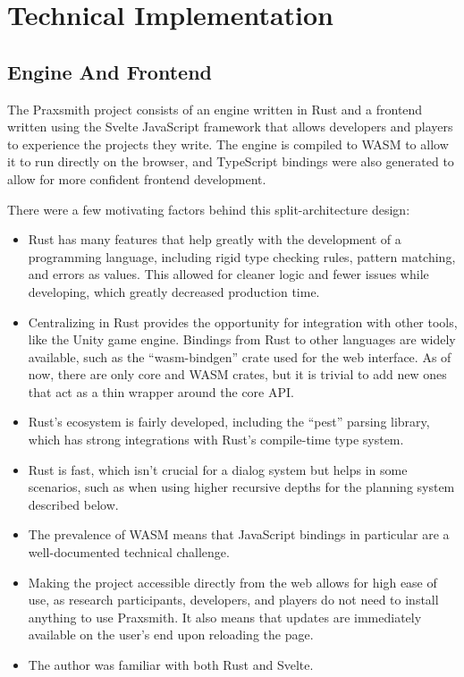 \chapter{Technical Implementation} \label{sec:TechnicalImplementation}

\section{Engine And Frontend} \label{sec:EngineAndFrontend}

The Praxsmith project consists of an engine written in Rust and a frontend written
using the Svelte JavaScript framework that allows developers and players to
experience the projects they write. The engine is compiled to WASM to allow it to
run directly on the browser, and TypeScript bindings were also generated to allow
for more confident frontend development.

There were a few motivating factors behind this split-architecture design:

\begin{itemize}
    \item Rust has many features that help greatly with the development of a programming
    language, including rigid type checking rules, pattern matching, and errors as values.
    This allowed for cleaner logic and fewer issues while developing, which greatly
    decreased production time.
    \item Centralizing in Rust provides the opportunity for integration with other tools,
    like the Unity game engine. Bindings from Rust to other languages are
    widely available, such as the ``wasm-bindgen'' crate used for the web interface. As of
    now, there are only core and WASM crates, but it is trivial to add new ones that
    act as a thin wrapper around the core API.
    \item Rust's ecosystem is fairly developed, including the ``pest'' parsing library,
    which has strong integrations with Rust's compile-time type system.
    \item Rust is fast, which isn't crucial for a dialog system but helps in some scenarios,
    such as when using higher recursive depths for the planning system described below.
    \item The prevalence of WASM means that JavaScript bindings in particular are a
    well-documented technical challenge.
    \item Making the project accessible directly from the web allows for high ease of use,
    as research participants, developers, and players do not need to install anything to
    use Praxsmith. It also means that updates are immediately available on the user's
    end upon reloading the page.
    \item The author was familiar with both Rust and Svelte.
\end{itemize}

